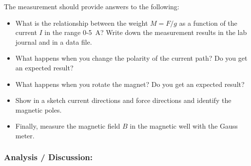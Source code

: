 \documentclass[../Elmag-labhefte-2020.tex]{subfiles}
\begin{document}
The measurement should provide answers to the following:
\begin{itemize}
\item What is the relationship between the weight $M  = F/g$ as a function of the current $I$ in the range 0-\SI{5}{\ampere}? Write down the measurement results in the lab journal and in a data file.
\item What happens when you change the polarity of the current path? Do you get an expected result?
\item What happens when you rotate the magnet? Do you get an expected result?
\item Show in a sketch current directions and force directions and identify the magnetic poles.
\item Finally, measure the magnetic field $B$ in the magnetic well with the Gauss meter.
\end{itemize}

\subsubsection{Analysis / Discussion:}
\end{document}
